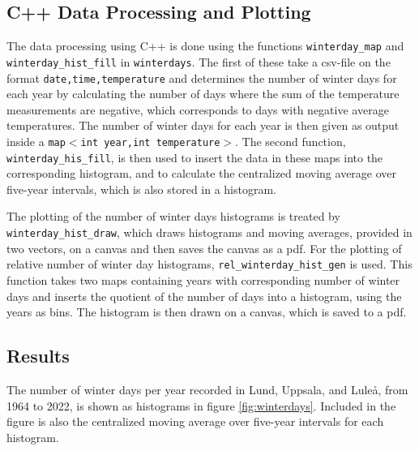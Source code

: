 \documentclass[aps,prl,groupedaddress,twocolumn]{revtex4-1}
\begin{document}
\subsection{C++ Data Processing and Plotting}

The data processing using C++ is done using the functions \texttt{winterday\_map} and \texttt{winterday\_hist\_fill} in \texttt{winterdays}. The first of these take a csv-file on the format \texttt{date,time,temperature} and determines the number of winter days for each year by calculating the number of days where the sum of the temperature measurements are negative, which corresponds to days with negative average temperatures. The number of winter days for each year is then given as output inside a \texttt{map$<$int year,int temperature$>$}. The second function, \texttt{winterday\_his\_fill}, is then used to insert the data in these maps into the corresponding histogram, and to calculate the centralized moving average over five-year intervals, which is also stored in a histogram.

The plotting of the number of winter days histograms is treated by \texttt{winterday\_hist\_draw}, which draws histograms and moving averages, provided in two vectors, on a canvas and then saves the canvas as a pdf. For the plotting of relative number of winter day histograms, \texttt{rel\_winterday\_hist\_gen} is used. This function takes two maps containing years with corresponding number of winter days and inserts the quotient of the number of days into a histogram, using the years as bins. The histogram is then drawn on a canvas, which is saved to a pdf.
\vspace{-0.5cm}

\subsection{Results}

The number of winter days per year recorded in Lund, Uppsala, and Luleå, from 1964 to 2022, is shown as histograms in figure \ref{fig:winterdays}. Included in the figure is also the centralized moving average over five-year intervals for each histogram. 
\vspace{-0.3cm}
\end{document}
